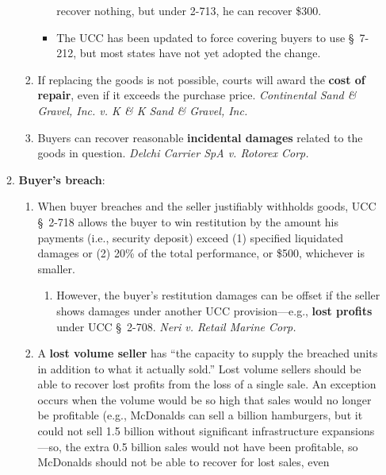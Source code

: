 \begin{enumerate}
\begin{enumerate}
\begin{enumerate}
\begin{itemize}
                recover nothing, but under 2-713, he can recover \$300.
                \item The UCC has been updated to force covering buyers to use 
                \S\ 7-212, but most states have not yet adopted the change.
            \end{itemize}
            \item If replacing the goods is not possible, courts will award 
            the \textbf{cost of repair}, even if it exceeds the purchase 
            price.  \emph{Continental Sand \& Gravel, Inc. v. K \& K Sand \& 
            Gravel, Inc.}
            \item Buyers can recover reasonable \textbf{incidental damages} 
            related to the goods in question. \emph{Delchi Carrier SpA v. 
            Rotorex Corp.}
        \end{enumerate}
        \item \textbf{Buyer's breach}:
        \begin{enumerate}
            \item When buyer breaches and the seller justifiably withholds 
            goods, UCC \S\ 2-718 allows the buyer to win restitution by the 
            amount his payments (i.e., security deposit) exceed (1) specified 
            liquidated damages or (2) 20\% of the total performance, or \$500, 
            whichever is smaller.
            \begin{enumerate}
                \item However, the buyer's restitution damages can be offset 
                if the seller shows damages under another UCC 
                provision---e.g., \textbf{lost profits} under UCC \S\ 2-708. 
                \emph{Neri v. Retail Marine Corp.}
            \end{enumerate}
            \item A \textbf{lost volume seller} has ``the capacity to supply 
            the breached units in addition to what it actually sold.'' Lost 
            volume sellers should be able to recover lost profits from the 
            loss of a single sale. An exception occurs when the volume would 
            be so high that sales would no longer be profitable (e.g., 
            McDonalds can sell a billion hamburgers, but it could not sell 1.5 
            billion without significant infrastructure expansions---so, the 
            extra 0.5 billion sales would not have been profitable, so 
            McDonalds should not be able to recover for lost sales, even 

\end{enumerate}
\end{enumerate}
\end{enumerate}
